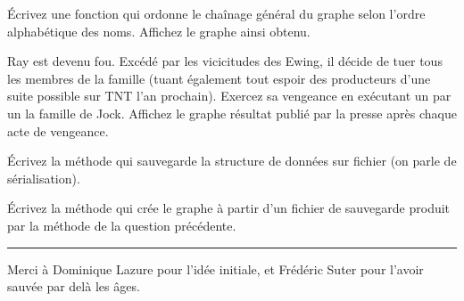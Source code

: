\documentclass[10pt]{article}\usepackage[nu]{esial}
\begin{document}
\Question Écrivez une fonction qui ordonne le chaînage général du graphe selon
l'ordre alphabétique des noms. Affichez le graphe ainsi obtenu.

\Question Ray est devenu fou. Excédé par les vicicitudes des Ewing, il décide
de tuer tous les membres de la famille (tuant également tout espoir des
producteurs d'une suite possible sur TNT l'an prochain).  Exercez sa vengeance
en exécutant un par un la famille de Jock. Affichez le graphe résultat publié
par la presse après chaque acte de vengeance.

\Question Écrivez la méthode qui sauvegarde la structure de données sur fichier
(on parle de sérialisation).

\Question Écrivez la méthode qui crée le graphe à partir d'un fichier de
sauvegarde produit par la méthode de la question précédente.

\vfill
\hrule

\medskip\noindent
Merci à Dominique Lazure pour l'idée initiale, et Frédéric Suter pour
l'avoir sauvée par delà les âges.

\begin{figure}
  \centering
\end{figure}
\end{document}
